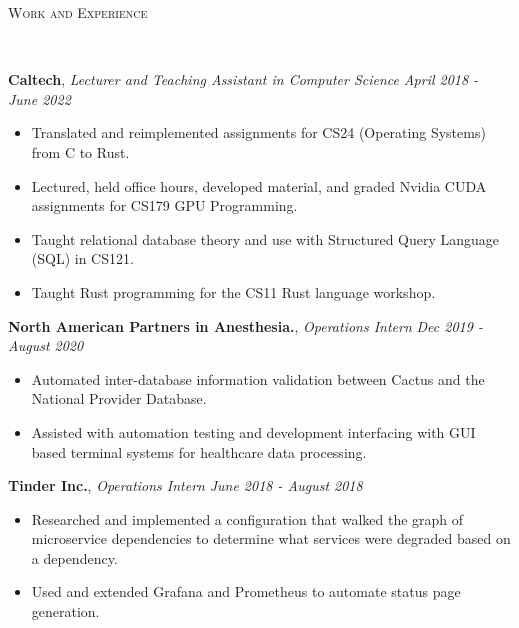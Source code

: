 \documentclass[9pt]{article}
\newenvironment{changemargin}[2]{%
  \begin{list}{}{%
    \setlength{\topsep}{0pt}%
    \setlength{\leftmargin}{#1}%
    \setlength{\rightmargin}{#2}%
    \setlength{\listparindent}{\parindent}%
    \setlength{\itemindent}{\parindent}%
    \setlength{\parsep}{\parskip}%
  }%
  \item[]}{\end{list}
}
\newcommand{\lineover}{
	\begin{changemargin}{-0.05in}{-0.05in}
		\vspace*{-8pt}
		\hrulefill \\
		\vspace*{-2pt}
	\end{changemargin}
}
\newcommand{\header}[1]{
	\begin{changemargin}{-0.5in}{-0.5in}
		\scshape{#1}\\
  	\lineover
	\end{changemargin}
}
\newenvironment{body} {
	\vspace*{-16pt}
	\begin{changemargin}{-0.25in}{-0.5in}
  }	
	{\end{changemargin}
}
\begin{document}
\header{Work and Experience}
\begin{body}
	\vspace{14pt}
	\textbf{Caltech}, \emph{Lecturer and Teaching Assistant in Computer Science} \hfill \emph{April 2018 - June 2022}\\
	\vspace*{-3pt}
	\begin{itemize} \itemsep -0pt %
		\item Translated and reimplemented assignments for CS24 (Operating
		Systems) from C to Rust.
		\item Lectured, held office hours, developed material, and graded Nvidia CUDA assignments for CS179 GPU Programming.
		\item Taught relational database theory and use with Structured Query Language
		      (SQL) in CS121.
		\item Taught Rust programming for the CS11 Rust language workshop.
	\end{itemize}
	\vspace*{-2pt}

	\textbf{North American Partners in Anesthesia.}, \emph{Operations Intern} \hfill
	\emph{Dec 2019 - August 2020}\\
	\vspace*{-3pt}
	\begin{itemize} \itemsep -0pt %
		\item Automated inter-database information validation between Cactus and the
		      National Provider Database.
		\item Assisted with automation testing and development interfacing with GUI based terminal
		      systems for healthcare data processing.
	\end{itemize}
	\vspace*{-2pt}

	\textbf{Tinder Inc.}, \emph{Operations Intern} \hfill \emph{June 2018 - August 2018}\\
	\vspace*{-3pt}
	\begin{itemize} \itemsep -0pt %
		\item Researched and implemented a configuration that walked the graph of
		microservice dependencies to determine what services were degraded based on a dependency.
		\item Used and extended Grafana and Prometheus to automate status page generation.
	\end{itemize}
	\vspace*{-2pt}



\end{body}
\end{document}
